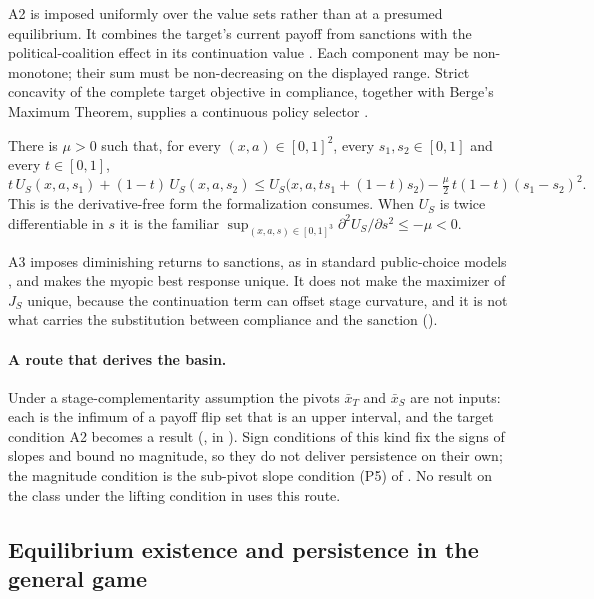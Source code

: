 A2 is imposed uniformly over the value sets rather than at a presumed
equilibrium. It combines the target's current payoff from sanctions with
the political-coalition effect in its continuation value
\citep{Kaempfer1988}. Each component may be non-monotone; their sum must
be non-decreasing on the displayed range. Strict concavity of the
complete target objective in compliance, together with Berge's Maximum
Theorem, supplies a continuous policy selector
\citep{AliprantisBorder2006}.

\begin{assumption}
\label{ass:concavity}
There is $\mu>0$ such that, for every $(x,a)\in[0,1]^2$, every
$s_1,s_2\in[0,1]$ and every $t\in[0,1]$,
\[
t\,U_S(x,a,s_1)+(1-t)\,U_S(x,a,s_2)
\le U_S\bigl(x,a,ts_1+(1-t)s_2\bigr)-\tfrac{\mu}{2}\,t(1-t)(s_1-s_2)^2 .
\]
This is the derivative-free form the formalization consumes. When $U_S$ is twice
differentiable in $s$ it is the familiar
$\sup_{(x,a,s)\in[0,1]^3}\partial^2 U_S/\partial s^2\le-\mu<0$.
\end{assumption}

A3 imposes diminishing returns to sanctions, as in standard public-choice
models \citep{Kaempfer1988,Eaton1992}, and makes the myopic best response
unique. It does not make the maximizer of $J_S$ unique, because the continuation
term can offset stage curvature, and it is not what carries the substitution
between compliance and the sanction ().

\paragraph{A route that derives the basin.}
Under a stage-complementarity assumption the pivots $\bar x_T$ and $\bar x_S$
are not inputs: each is the infimum of a payoff flip set that is an upper
interval, and the target condition A2 becomes a result
(, in ). Sign
conditions of this kind fix the signs of slopes and bound no magnitude, so they do not
deliver persistence on their own; the magnitude condition is the sub-pivot
slope condition (P5) of . No result on the class under the lifting condition in
 uses this route.

\subsection{Equilibrium existence and persistence in the general game}
\label{sec:existence:general}

